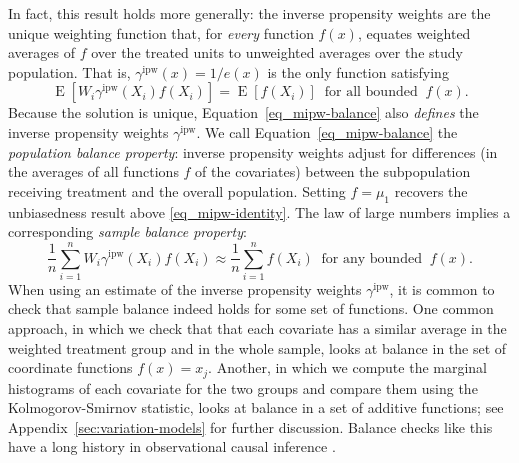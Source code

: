 \documentclass{article}
\theoremstyle{definition}
\DeclareMathOperator{\E}{E}
\newcommand{\ipw}{\text{ipw}}
\newcommand{\gammaipw}{\ensuremath{\gamma^{\ipw}}}
\newcommand{\<}{\langle}
\renewcommand{\>}{\rangle}
\begin{document}
\noindent In fact, this result holds more generally: the inverse propensity weights are the unique weighting function that, for \emph{every} function $f(x)$,
equates weighted averages of $f$ over the treated units to unweighted averages over the study population.
That is, $\gammaipw(x)=1/e(x)$ is the only function  satisfying
\begin{equation}
    \label{eq_mipw-balance}
    \E\left[W_i \gammaipw(X_i) f(X_i)\right] = \E\left[f(X_i)\right]  \ \text{ for all bounded }\ f(x). \end{equation}
Because the solution is unique, Equation~\ref{eq_mipw-balance} also \emph{defines} the inverse propensity weights $\gammaipw$.
We call Equation~\ref{eq_mipw-balance} the \emph{population balance property}: inverse propensity weights adjust for
 differences (in the averages of all functions $f$ of the covariates) between the subpopulation receiving treatment and the overall population.
Setting $f=\mu_1$ recovers the unbiasedness result above \eqref{eq_mipw-identity}. The law of large numbers implies a corresponding \emph{sample balance property}:
\begin{equation}
    \label{eq_mipw-sample-balance}
    \frac{1}{n}\sum_{i=1}^n W_i \gammaipw(X_i) f(X_i) \approx \frac{1}{n}\sum_{i=1}^n f(X_i) \   \text{ for any bounded }\ f(x).
\end{equation}
 When using an estimate of the inverse propensity weights $\gammaipw$, it is common to check that sample balance indeed holds for some set of functions. One common approach, in which we check that that each covariate has a similar average in the weighted treatment group and in the whole sample, looks at balance in the set of coordinate functions $f(x)=x_{j}$. Another, in which we compute the marginal histograms of each covariate for the two groups and compare them using the Kolmogorov-Smirnov statistic, looks at balance in a set of additive functions; see Appendix~\ref{sec:variation-models} for further discussion.
 Balance checks like this have a long history in observational causal inference \citep{cochran1965planning}.

\vspace{-.3cm}
\end{document}
